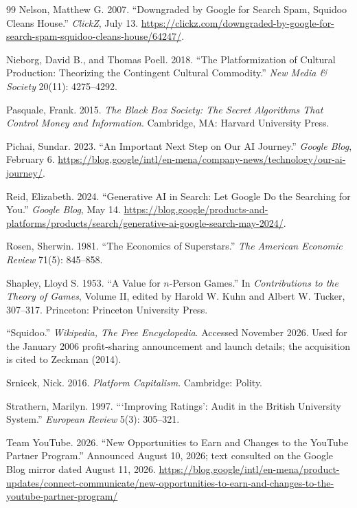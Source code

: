 \documentclass[11pt]{article}
\theoremstyle{remark}
\begin{document}
\begin{thebibliography}{99}
Nelson, Matthew G. 2007. ``Downgraded by Google for Search Spam, Squidoo Cleans House.'' \emph{ClickZ}, July 13. \url{https://clickz.com/downgraded-by-google-for-search-spam-squidoo-cleans-house/64247/}.

Nieborg, David B., and Thomas Poell. 2018. ``The Platformization of Cultural Production: Theorizing the Contingent Cultural Commodity.'' \emph{New Media \& Society} 20(11): 4275--4292.

Pasquale, Frank. 2015. \emph{The Black Box Society: The Secret Algorithms That Control Money and Information}. Cambridge, MA: Harvard University Press.

Pichai, Sundar. 2023. ``An Important Next Step on Our AI Journey.'' \emph{Google Blog}, February 6. \url{https://blog.google/intl/en-mena/company-news/technology/our-ai-journey/}.

Reid, Elizabeth. 2024. ``Generative AI in Search: Let Google Do the Searching for You.'' \emph{Google Blog}, May 14. \url{https://blog.google/products-and-platforms/products/search/generative-ai-google-search-may-2024/}.

Rosen, Sherwin. 1981. ``The Economics of Superstars.'' \emph{The American Economic Review} 71(5): 845--858.

Shapley, Lloyd S. 1953. ``A Value for $n$-Person Games.'' In \emph{Contributions to the Theory of Games}, Volume II, edited by Harold W. Kuhn and Albert W. Tucker, 307--317. Princeton: Princeton University Press.

``Squidoo.'' \emph{Wikipedia, The Free Encyclopedia}. Accessed November 2026. Used for the January 2006 profit-sharing announcement and launch details; the acquisition is cited to Zeckman (2014).

Srnicek, Nick. 2016. \emph{Platform Capitalism}. Cambridge: Polity.

Strathern, Marilyn. 1997. ```Improving Ratings': Audit in the British University System.'' \emph{European Review} 5(3): 305--321.

Team YouTube. 2026. ``New Opportunities to Earn and Changes to the YouTube Partner Program.'' Announced August 10, 2026; text consulted on the Google Blog mirror dated August 11, 2026. \url{https://blog.google/intl/en-mena/product-updates/connect-communicate/new-opportunities-to-earn-and-changes-to-the-youtube-partner-program/}


\end{thebibliography}
\end{document}
